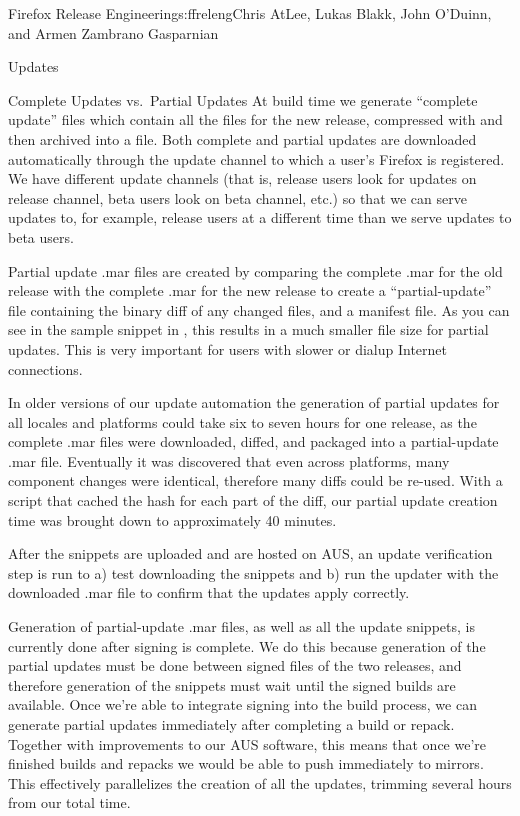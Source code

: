 \begin{aosachapter}{Firefox Release Engineering}{s:ffreleng}{Chris AtLee, Lukas Blakk, John O'Duinn, and Armen Zambrano Gasparnian}
\begin{aosasect1}{Updates}
\begin{aosasect2}{Complete Updates vs.\ Partial Updates}
At build time we generate ``complete update''  files which
contain all the files for the new release, compressed with 
and then archived into a  file. Both complete and partial
updates are downloaded automatically through the update channel to which a 
user's Firefox is registered. We have different update channels (that is,
release users look
for updates on release channel, beta users look on beta channel, etc.) so that
we can serve updates to, for example, release users at a different time than 
we serve updates to beta users.

Partial update .mar files are created by comparing the complete .mar for the
old release with the complete .mar for the new release to create a
``partial-update''  file containing the binary diff of any
changed files, and a manifest file. As you can see in the sample
snippet in , this results in a much smaller file size for partial
updates. This is very important for users with slower or
dialup Internet connections.

In older versions of our update automation the generation of partial
updates for all locales and platforms could take six to seven hours for one
release, as the complete .mar files were downloaded, diffed, and packaged into a
partial-update .mar file. Eventually it was discovered that even
across platforms, many component changes were identical, therefore many diffs could be re-used. With a
script that cached the hash for each part of the diff, our partial
update creation time was brought down to approximately 40 minutes. 

After the snippets are
uploaded and are hosted on AUS, an update verification step is run to
a) test downloading the snippets and b) run the updater with the
downloaded .mar file to confirm that the updates apply correctly.

Generation of partial-update .mar files, as well as all the update snippets,
is currently done after signing is complete. We do this because
generation of the partial updates must be done between signed files of
the two releases, and therefore generation of the snippets must wait
until the signed builds are available.  Once we're able to integrate
signing into the build process, we can generate partial updates
immediately after completing a build or repack. Together with
improvements to our AUS software, this means that once we're finished
builds and repacks we would be able to push immediately to
mirrors. This effectively parallelizes the creation of all the
updates, trimming several hours from our total time.
  

\end{aosasect2}
\end{aosasect1}
\end{aosachapter}

